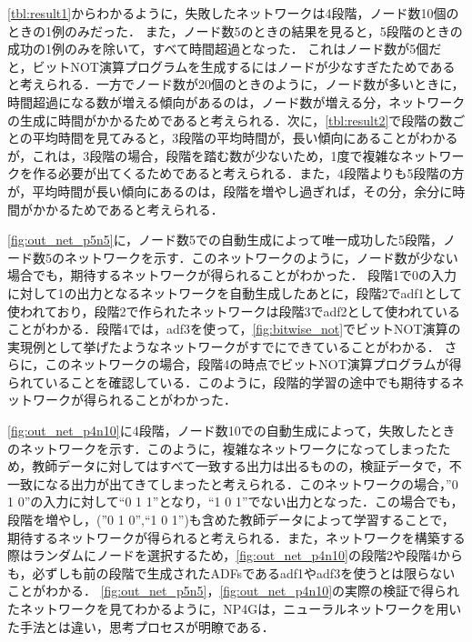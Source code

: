 \documentclass[exploratorypaper]{jsaiart} %
\begin{document}
\ref{tbl:result1}からわかるように，失敗したネットワークは4段階，ノード数10個のときの1例のみだった．
また，ノード数5のときの結果を見ると，5段階のときの成功の1例のみを除いて，すべて時間超過となった．
これはノード数が5個だと，ビットNOT演算プログラムを生成するにはノードが少なすぎたためであると考えられる．一方でノード数が20個のときのように，ノード数が多いときに，時間超過になる数が増える傾向があるのは，ノード数が増える分，ネットワークの生成に時間がかかるためであると考えられる．次に，\ref{tbl:result2}で段階の数ごとの平均時間を見てみると，3段階の平均時間が，長い傾向にあることがわかるが，これは，3段階の場合，段階を踏む数が少ないため，1度で複雑なネットワークを作る必要が出てくるためであると考えられる．また，4段階よりも5段階の方が，平均時間が長い傾向にあるのは，段階を増やし過ぎれば，その分，余分に時間がかかるためであると考えられる．

\ref{fig:out_net_p5n5}に，ノード数5での自動生成によって唯一成功した5段階，ノード数5のネットワークを示す．このネットワークのように，ノード数が少ない場合でも，期待するネットワークが得られることがわかった．
段階1で0の入力に対して1の出力となるネットワークを自動生成したあとに，段階2でadf1として使われており，段階2で作られたネットワークは段階3でadf2として使われていることがわかる．段階4では，adf3を使って，\ref{fig:bitwise_not}でビットNOT演算の実現例として挙げたようなネットワークがすでにできていることがわかる．
さらに，このネットワークの場合，段階4の時点でビットNOT演算プログラムが得られていることを確認している．このように，段階的学習の途中でも期待するネットワークが得られることがわかった．

\ref{fig:out_net_p4n10}に4段階，ノード数10での自動生成によって，失敗したときのネットワークを示す．このように，複雑なネットワークになってしまったため，教師データに対してはすべて一致する出力は出るものの，検証データで，不一致になる出力が出てきてしまったと考えられる．このネットワークの場合，”0 1 0”の入力に対して“0 1 1”となり，“1 0 1”でない出力となった．この場合でも，段階を増やし，(”0 1 0”,“1 0 1”)も含めた教師データによって学習することで，期待するネットワークが得られると考えられる．また，ネットワークを構築する際はランダムにノードを選択するため，\ref{fig:out_net_p4n10}の段階2や段階4からも，必ずしも前の段階で生成されたADFsであるadf1やadf3を使うとは限らないことがわかる．
\ref{fig:out_net_p5n5}，\ref{fig:out_net_p4n10}の実際の検証で得られたネットワークを見てわかるように，NP4Gは，ニューラルネットワークを用いた手法とは違い，思考プロセスが明瞭である．
\end{document}
